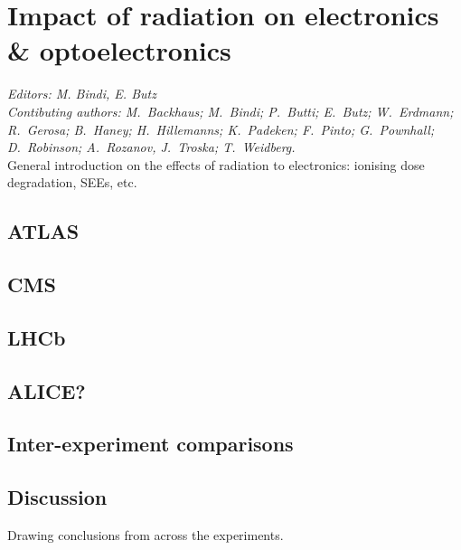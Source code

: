 \section{Impact of radiation on electronics \& optoelectronics}
\label{sec:electronics}

{\it Editors: M. Bindi, E. Butz}  \\
{\it Contibuting authors: M.~Backhaus; M.~Bindi; P.~Butti; E.~Butz; W.~Erdmann; R.~Gerosa; B.~Haney; H.~Hillemanns; K.~Padeken; F.~Pinto; G.~Pownhall; D.~Robinson; A.~Rozanov, J.~Troska; T.~Weidberg.}  \\

\noindent 
General introduction on the effects of radiation to electronics: ionising dose degradation, SEEs, etc. 

\subsection{ATLAS}

\subsection{CMS}

\subsection{LHCb}

\subsection{ALICE?}

\subsection{Inter-experiment comparisons}

\subsection{Discussion}
Drawing conclusions from across the experiments. 

\begin{thebibliography}{99}
\end{thebibliography}
